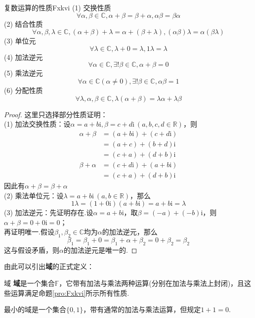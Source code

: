 \documentclass[lang=cn, zihao=5]{elegantbook}
\newcommand{\R}{\mathbb{R}}
\newcommand{\C}{\mathbb{C}}
\newcommand{\F}{\mathbb{F}}
\newcommand{\ic}{\text{i}}
\begin{document}
\begin{proposition}{复数运算的性质}{Fxkvi}
	(1) 交换性质$$\forall \alpha , \beta \in \C , \alpha + \beta = \beta + \alpha , \alpha \beta = \beta \alpha$$
	(2) 结合性质$$\forall \alpha , \beta , \lambda \in \C , (\alpha + \beta) + \lambda = \alpha + (\beta + \lambda) , (\alpha \beta) \lambda = \alpha (\beta \lambda)$$
	(3) 单位元$$\forall \lambda \in \C , \lambda + 0 = \lambda , 1 \lambda = \lambda$$
	(4) 加法逆元$$\forall \alpha \in \C , \exists ! \beta \in \C , \alpha + \beta = 0$$
	(5) 乘法逆元$$\forall \alpha \in \C (\alpha \neq 0) , \exists ! \beta \in \C , \alpha \beta = 1$$
	(6) 分配性质$$\forall \lambda , \alpha , \beta \in \C , \lambda (\alpha + \beta) = \lambda \alpha + \lambda \beta$$
\end{proposition}
\begin{proof}
	这里只选择部分性质证明： \\
	(1) 加法交换性质：设$\alpha = a+b\ic , \beta = c+d\ic ~(a,b,c,d \in \R )$，则
	\begin{align*}
		\alpha + \beta &= (a+b\ic ) + (c+d\ic ) \\
		&= (a+c) + (b+d)\ic \\
		&= (c+a) + (d+b)\ic \\
		\beta + \alpha &= (c+d\ic ) + (a+b\ic ) \\
		&= (c+a) + (d+b)\ic
	\end{align*}
	因此有$\alpha + \beta = \beta + \alpha$ \\
	(2) 乘法单位元：设$\lambda = a+b\ic ~ (a,b \in \R )$，那么$$1 \lambda = (1+0\ic )(a+b\ic ) = a + b\ic = \lambda$$
	(3) 加法逆元：先证明存在.设$\alpha = a+b\ic $，取$\beta = (-a) + (-b)\ic $，则$\alpha + \beta = 0+0\ic = 0$；\\
	再证明唯一.假设$\beta _1, \beta _2 \in \C $均为$\alpha$的加法逆元，那么$$\beta _1 = \beta _1 + 0 = \beta _1 + \alpha + \beta _2 = 0 + \beta _2 = \beta _2$$
	这与假设矛盾，则$\alpha$的加法逆元是唯一的.
\end{proof}

由此可以引出\textbf{域}的正式定义：

\begin{definition}{域}
	\textbf{域}是一个集合$\F$，它带有加法与乘法两种运算(分别在加法与乘法上封闭)，且这些运算满足命题\ref{pro:Fxkvi}所示所有性质.
\end{definition}
\begin{remark}
	最小的域是一个集合$\{ 0,1 \}$，带有通常的加法与乘法运算，但规定$1+1=0$.
\end{remark}
\end{document}
